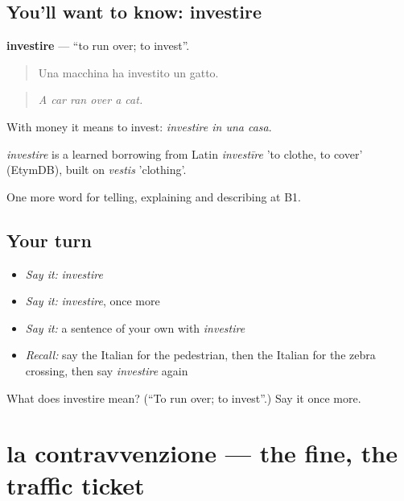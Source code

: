 \subsection*{You'll want to know: investire}
\textbf{investire} — \textquotedblleft{}to run over; to invest\textquotedblright{}.

\begin{quote}
Una macchina ha investito un gatto.
\end{quote}

\begin{quote}
\emph{A car ran over a cat.}
\end{quote}

With money it means to invest: \emph{investire in una casa}.

\begin{cousinweb}
\emph{investire} is a learned borrowing from Latin \emph{investīre} 'to clothe, to cover' (EtymDB), built on \emph{vestis} 'clothing'.
\end{cousinweb}

\begin{grammarlens}[title={What you've built}]
One more word for telling, explaining and describing at B1.
\end{grammarlens}

\subsection*{Your turn}
\begin{itemize}
\raggedright
  \item \emph{Say it:} \emph{investire}
  \item \emph{Say it:} \emph{investire}, once more
  \item \emph{Say it:} a sentence of your own with \emph{investire}
  \item \emph{Recall:} say the Italian for the pedestrian, then the Italian for the zebra crossing, then say \emph{investire} again
\end{itemize}

\begin{tcolorbox}[breakable,colback=teal!4,colframe=teal!35!black,title={Before you move on}]
What does investire mean? (\textquotedblleft{}To run over; to invest\textquotedblright{}.) Say it once more.
\end{tcolorbox}
\section[la contravvenzione]{la contravvenzione — the fine, the traffic ticket}


